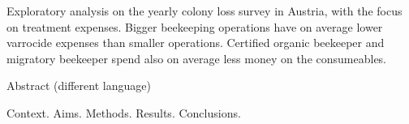\label{sec:abstract}

Exploratory analysis on the yearly colony loss survey in Austria, with the focus on treatment expenses. Bigger beekeeping operations have on average lower varrocide expenses than smaller operations. Certified organic beekeeper and migratory beekeeper spend also on average less money on the consumeables.

\vspace*{20mm}

{Abstract (different language)}
\label{sec:abstract-diff}

\blindtext

Context.
Aims.
Methods.
Results.
Conclusions.